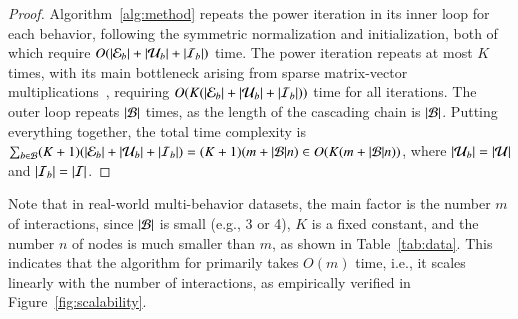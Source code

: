 \begin{proof}
Algorithm~\ref{alg:method} repeats the power iteration in its inner loop for each behavior, following the symmetric normalization and initialization, both of which require $O(|\mathcal{E}_{b}| + |\mathcal{U}_{b}| + |\mathcal{I}_{b}|)$ time.
The power iteration repeats at most $K$ times, with its main bottleneck arising from sparse matrix-vector multiplications~\cite{daglib}, requiring $O(K(|\mathcal{E}_{b}| + |\mathcal{U}_{b}| + |\mathcal{I}_{b}|))$ time for all iterations.
The outer loop repeats $|\mathcal{B}|$ times, as the length of the cascading chain is $|\mathcal{B}|$.
Putting everything together, the total time complexity is $\sum_{b \in \mathcal{B}} (K+1)(|\mathcal{E}_{b}| + |\mathcal{U}_{b}| + |\mathcal{I}_{b}|) = (K+1)(m + |\mathcal{B}| n) \in O(K  (m + |\mathcal{B}| n))$, where $|\mathcal{U}_{b}| = |\mathcal{U}|$ and $|\mathcal{I}_{b}| = |\mathcal{I}|$.
\end{proof}

Note that in real-world multi-behavior datasets, the main factor is the number $m$ of interactions, since $|\mathcal{B}|$ is small (e.g., 3 or 4), $K$ is a fixed constant, and the number $n$ of nodes is much smaller than $m$, as shown in Table~\ref{tab:data}. 
This indicates that the algorithm for \method primarily takes $O(m)$ time, i.e., it scales linearly with the number of interactions, as empirically verified in Figure~\ref{fig:scalability}.
